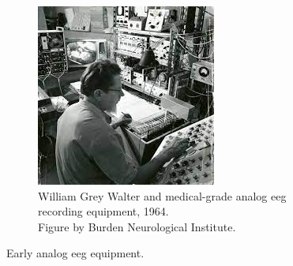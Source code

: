 \begin{figure}[ht]
\begin{minipage}{\textwidth}
\begin{subfigure}{.48\textwidth}
        \label{fig:eeg_hardware_evolution_3}
    \end{subfigure}
    \hfill
    \begin{subfigure}{.48\textwidth}
        \centering
        \includegraphics[width=\textwidth]{images/hardware/grey_walter.jpg}
        \captionsetup{width=0.9\linewidth}
        \captionsetup{justification=centering}
        \caption{William Grey Walter and medical-grade analog \gls{eeg} recording equipment, 1964.\\Figure by Burden Neurological Institute\footnotemark[3].}
        \label{fig:eeg_hardware_evolution_4}
    \end{subfigure}
    \captionsetup{width=0.9\linewidth}
    \captionsetup{justification=centering}
    \caption{Early analog \gls{eeg} equipment.}
    \label{fig:eeg_hardware_early_analog}
  \end{minipage}  
\end{figure}


